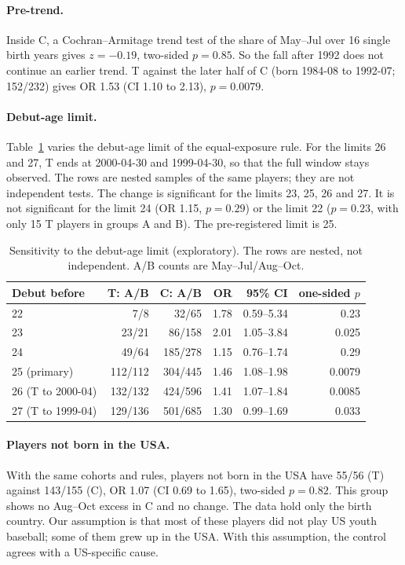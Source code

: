 \documentclass[11pt]{article}
\begin{document}
\paragraph{Pre-trend.} Inside C, a Cochran--Armitage trend test of the share of May--Jul over 16 single birth years gives $z = -0.19$, two-sided $p = 0.85$. So the fall after 1992 does not continue an earlier trend. T against the later half of C (born 1984-08 to 1992-07; 152/232) gives OR 1.53 (CI 1.10 to 2.13), $p = 0.0079$.

\paragraph{Debut-age limit.} Table~\ref{tab:age} varies the debut-age limit of the equal-exposure rule. For the limits 26 and 27, T ends at 2000-04-30 and 1999-04-30, so that the full window stays observed. The rows are nested samples of the same players; they are not independent tests. The change is significant for the limits 23, 25, 26 and 27. It is not significant for the limit 24 (OR 1.15, $p = 0.29$) or the limit 22 ($p = 0.23$, with only 15 T players in groups A and B). The pre-registered limit is 25.

\begin{table}[ht]
\centering
\caption{Sensitivity to the debut-age limit (exploratory). The rows are nested, not independent. A/B counts are May--Jul/Aug--Oct.}
\label{tab:age}
\begin{tabular}{lrrrrr}
\toprule
Debut before & T: A/B & C: A/B & OR & 95\% CI & one-sided $p$ \\
\midrule
22 & 7/8 & 32/65 & 1.78 & 0.59--5.34 & 0.23 \\
23 & 23/21 & 86/158 & 2.01 & 1.05--3.84 & 0.025 \\
24 & 49/64 & 185/278 & 1.15 & 0.76--1.74 & 0.29 \\
25 (primary) & 112/112 & 304/445 & 1.46 & 1.08--1.98 & 0.0079 \\
26 (T to 2000-04) & 132/132 & 424/596 & 1.41 & 1.07--1.84 & 0.0085 \\
27 (T to 1999-04) & 129/136 & 501/685 & 1.30 & 0.99--1.69 & 0.033 \\
\bottomrule
\end{tabular}
\end{table}

\paragraph{Players not born in the USA.} With the same cohorts and rules, players not born in the USA have 55/56 (T) against 143/155 (C), OR 1.07 (CI 0.69 to 1.65), two-sided $p = 0.82$. This group shows no Aug--Oct excess in C and no change. The data hold only the birth country. Our assumption is that most of these players did not play US youth baseball; some of them grew up in the USA. With this assumption, the control agrees with a US-specific cause.
\end{document}
